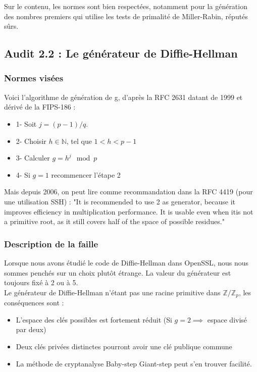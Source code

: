 			Sur le contenu, les normes sont bien respectées, notamment pour la génération des nombres premiers qui utilise les tests de primalité de Miller-Rabin, réputés sûrs.


	\subsection{Audit 2.2 : Le générateur de Diffie-Hellman}
		\subsubsection{\label{audit2.2}Normes visées}

		Voici l'algorithme de génération de g, d'après la RFC 2631 \cite{rfc2631} datant de 1999 et dérivé de la FIPS-186 : 
		\begin{itemize}
		\item 1- Soit $j = (p - 1)/q$.
		\item 2- Choisir $h \in \mathbb{N}$, tel que $1 < h < p - 1$
		\item 3- Calculer $g = h^j \mod p$
		\item 4- Si $g = 1$ recommencer l'étape 2\\
		\end{itemize}
	
		Mais depuis 2006, on peut lire comme recommandation dans la RFC 4419 (pour une utilisation SSH) : "It is recommended to use 2 as generator, because it improves	efficiency in multiplication performance.  It is usable even when itis not a primitive root, as it still covers half of the space of possible residues."\\
	
		\subsubsection{Description de la faille}
	
		Lorsque nous avons étudié le code de Diffie-Hellman dans OpenSSL, nous nous	sommes penchés sur un choix plutôt étrange. La valeur du générateur est toujours fixé à 2 ou à 5. \\
	
		Le générateur de Diffie-Hellman n'étant pas une racine primitive dans $\mathbb{Z}/\mathbb{Z}_p$, les conséquences sont :
		\begin{itemize}
		\item L'espace des clés possibles est fortement réduit (Si $g=2 \implies$ espace divisé par deux)
		\item Deux clés privées distinctes pourront avoir une clé publique commune
		\item La méthode de cryptanalyse Baby-step Giant-step peut s'en trouver 
		facilité.\\
		\end{itemize}
	
